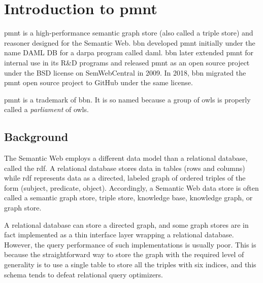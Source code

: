 
\chapter{Introduction to \acl{pmnt}}

\acl{pmnt} is a high-performance semantic graph store (also called a triple store) and reasoner designed for the Semantic Web. \acf{bbn} developed \ac{pmnt} initially under the name DAML DB for a \ac{darpa} program called \ac{daml}. \ac{bbn} later extended \ac{pmnt} for internal use in its R\&D programs and released \ac{pmnt} as an open source project under the BSD license on SemWebCentral in 2009. In 2018, \ac{bbn} migrated the \ac{pmnt} open source project to GitHub under the same license.

\acl{pmnt} is a trademark of \acl{bbn}. It is so named because a group of owls is properly called a \emph{parliament} of owls.

\section{Background}

The Semantic Web employs a different data model than a relational database, called the \ac{rdf}. A relational database stores data in tables (rows and columns) while \ac{rdf} represents data as a directed, labeled graph of ordered triples of the form (subject, predicate, object). Accordingly, a Semantic Web data store is often called a semantic graph store, triple store, knowledge base, knowledge graph, or graph store.

A relational database can store a directed graph, and some graph stores are in fact implemented as a thin interface layer wrapping a relational database. However, the query performance of such implementations is usually poor. This is because the straightforward way to store the graph with the required level of generality is to use a single table to store all the triples with six indices, and this schema tends to defeat relational query optimizers.

